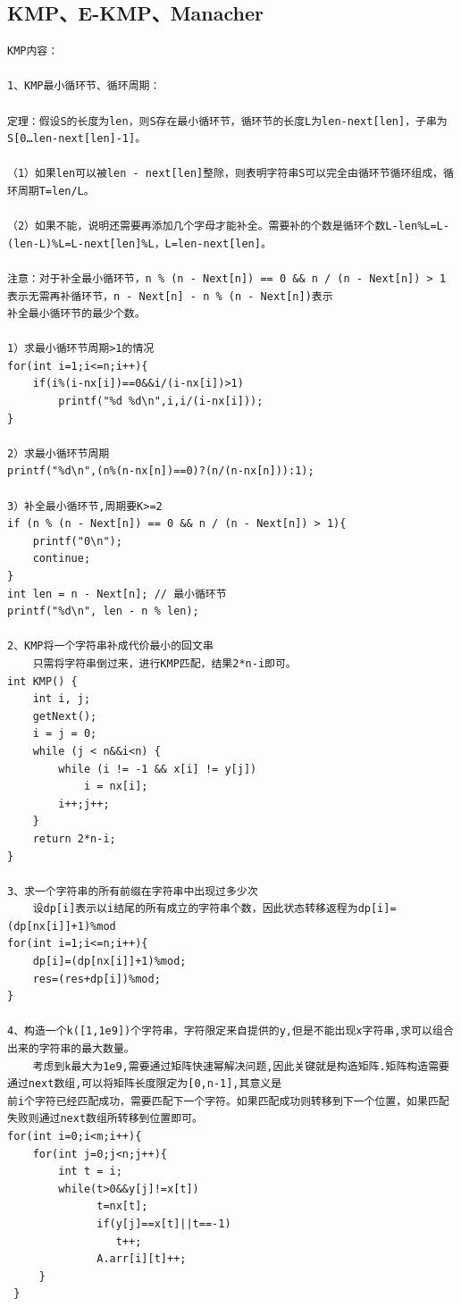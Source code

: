 \documentclass[twoside]{article}
\begin{document}
\subsection{KMP、E-KMP、Manacher}
\begin{lstlisting}
KMP内容：

1、KMP最小循环节、循环周期：

定理：假设S的长度为len，则S存在最小循环节，循环节的长度L为len-next[len]，子串为S[0…len-next[len]-1]。

（1）如果len可以被len - next[len]整除，则表明字符串S可以完全由循环节循环组成，循环周期T=len/L。

（2）如果不能，说明还需要再添加几个字母才能补全。需要补的个数是循环个数L-len%L=L-(len-L)%L=L-next[len]%L，L=len-next[len]。

注意：对于补全最小循环节，n % (n - Next[n]) == 0 && n / (n - Next[n]) > 1 表示无需再补循环节，n - Next[n] - n % (n - Next[n])表示
补全最小循环节的最少个数。

1）求最小循环节周期>1的情况
for(int i=1;i<=n;i++){
    if(i%(i-nx[i])==0&&i/(i-nx[i])>1)
        printf("%d %d\n",i,i/(i-nx[i]));
}

2）求最小循环节周期
printf("%d\n",(n%(n-nx[n])==0)?(n/(n-nx[n])):1);

3）补全最小循环节,周期要K>=2
if (n % (n - Next[n]) == 0 && n / (n - Next[n]) > 1){	
    printf("0\n");
    continue;
}
int len = n - Next[n]; // 最小循环节
printf("%d\n", len - n % len);

2、KMP将一个字符串补成代价最小的回文串
    只需将字符串倒过来，进行KMP匹配，结果2*n-i即可。
int KMP() {
    int i, j;
    getNext();
    i = j = 0;
    while (j < n&&i<n) {
        while (i != -1 && x[i] != y[j])
            i = nx[i];
        i++;j++;
    }
    return 2*n-i;
}

3、求一个字符串的所有前缀在字符串中出现过多少次
    设dp[i]表示以i结尾的所有成立的字符串个数，因此状态转移返程为dp[i]=(dp[nx[i]]+1)%mod
for(int i=1;i<=n;i++){
    dp[i]=(dp[nx[i]]+1)%mod;
    res=(res+dp[i])%mod;
}

4、构造一个k([1,1e9])个字符串，字符限定来自提供的y,但是不能出现x字符串,求可以组合出来的字符串的最大数量。
    考虑到k最大为1e9,需要通过矩阵快速幂解决问题,因此关键就是构造矩阵.矩阵构造需要通过next数组,可以将矩阵长度限定为[0,n-1],其意义是
前i个字符已经匹配成功，需要匹配下一个字符。如果匹配成功则转移到下一个位置，如果匹配失败则通过next数组所转移到位置即可。
for(int i=0;i<m;i++){
    for(int j=0;j<n;j++){
        int t = i;
        while(t>0&&y[j]!=x[t])
              t=nx[t];
              if(y[j]==x[t]||t==-1)
                 t++;
              A.arr[i][t]++;
     }
 }
 

\end{lstlisting}
\end{document}
